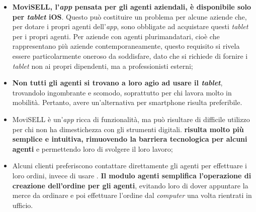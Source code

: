 \begin{itemize}
    \item \textbf{MoviSELL, l'\textit{app} pensata per gli agenti aziendali, è disponibile solo per \textit{tablet} iOS}. Questo può costituire un problema 
          per alcune aziende che, per dotare i propri agenti dell'\textit{app}, sono obbligate ad acquistare questi \textit{tablet} per i propri agenti. 
          Per aziende con agenti plurimandatari, cioè che rappresentano più aziende contemporaneamente, questo requisito si 
          rivela essere particolarmente oneroso da soddisfare, dato che si richiede di fornire i \textit{tablet} non ai propri dipendenti, 
          ma a professionisti esterni;
    \item \textbf{Non tutti gli agenti si trovano a loro agio ad usare il \textit{tablet}}, trovandolo ingombrante e scomodo, soprattutto per chi 
          lavora molto in mobilità. Pertanto, avere un'alternativa per smartphone risulta preferibile.
    \item MoviSELL è un'\textit{app} ricca di funzionalità, ma può risultare di difficile utilizzo per chi non ha dimestichezza con gli 
          strumenti digitali. \textbf{{\movi} risulta molto più semplice e intuitiva, rimuovendo la barriera tecnologica per alcuni 
          agenti} e permettendo loro di svolgere il loro lavoro;
    \item Alcuni clienti preferiscono contattare direttamente gli agenti per effettuare i loro ordini, invece di usare {\movi}. 
          \textbf{Il modulo agenti semplifica l'operazione di creazione dell'ordine per gli agenti}, evitando loro di dover appuntare 
          la merce da ordinare e poi effettuare l'ordine dal \textit{computer} una volta rientrati in ufficio.
\end{itemize}